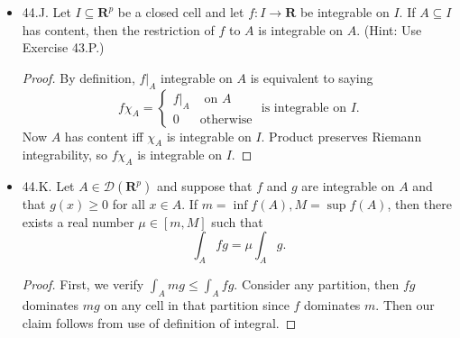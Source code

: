 \begin{itemize}
\begin{proof}
	Conversely, suppose $c_*(A) = c^*(A)$. It suffices to show $A$ has content, then by monotonicity we must have
	$c_*(A) \le c(A) \le c^*(A)$
	so $c(A) = c_*(A)$.

	It must be also assumed in this direction that $c^*(A)$ is finite, otherwise $A$ cannot have content. Under this assumption, we can take finitely many cells $B_1,B_2, \ldots, B_M $, which are assumed to be all open without loss of generality. Let $B$ be the finite union of all $B_m$, and
	\[
		B \supset A \qquad 
		c(B) < c^*(A) + \varepsilon
	.\] 
	Since $B$ is open, it must also contain the boundary of $A$. Similarly, we can choose finitely many open cells $C_i$, where
	\[
		C := \bigcup_{i = 1} ^{m'} C_i \subset A \qquad
		c(C) > c_*(A) - \varepsilon
	.\] 
	
	Since $C \subset B$ and $C \subset \text{int }A$, we must have 
	\[
		\partial A \subset  B \setminus C
	.\] 
	But $c(B \setminus C) = c(B) - c(C) < 2 \varepsilon$. $\varepsilon$ is arbitrary, so we conclude that $\partial A$ has content zero.
\end{proof}


\item 44.J. Let $I \subseteq \boldsymbol{R}^p$ be a closed cell and let $f: I \rightarrow \boldsymbol{R}$ be integrable on $I$. If $A \subseteq I$ has content, then the restriction of $f$ to $A$ is integrable on $A$. (Hint: Use Exercise 43.P.)
\begin{proof}
	By definition, $f|_A$ integrable on $A$ is equivalent to saying
	\[
		f \chi_A = \begin{cases}
			f|_A & \text{ on }A\\
			0 & \text{otherwise}
		\end{cases}
		\text{ is integrable on }I
	.\] 
	Now $A$ has content iff $\chi_A$ is integrable on $I$. Product preserves Riemann integrability, so $f \chi_A$ is integrable on $I$.
\end{proof}

\item 44.K. Let $A \in \mathscr{D}\left(\boldsymbol{R}^p\right)$ and suppose that $f$ and $g$ are integrable on $A$ and that $g(x) \geq 0$ for all $x \in A$. If $m=\inf f(A), M=\sup f(A)$, then there exists a real number $\mu \in[m, M]$ such that
\[
\int_A f g=\mu \int_A g .
\]
\begin{proof}
	First, we verify $\int _A m g \le \int_A f g$. Consider any partition, then $fg$ dominates $mg$ on any cell in that partition since $f$ dominates $m$. Then our claim follows from use of definition of integral.


\end{proof}
\end{itemize}
